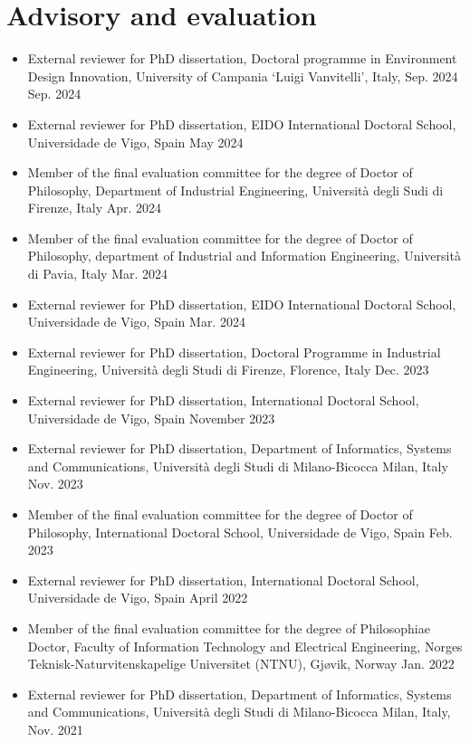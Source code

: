 \documentclass[11pt]{article}
\begin{document}
\section*{Advisory and evaluation}

\begin{itemize}
		\item External reviewer for PhD dissertation, Doctoral programme in Environment Design Innovation, University of Campania `Luigi Vanvitelli', Italy, Sep. 2024 \hfill Sep. 2024
    \item External reviewer for PhD dissertation, EIDO International Doctoral School, Universidade de Vigo, Spain \hfill May 2024
		\item Member of the final evaluation committee for the degree of Doctor of Philosophy, Department of Industrial Engineering, Università degli Sudi di Firenze, Italy \hfill Apr. 2024
    \item Member of the final evaluation committee for the degree of Doctor of Philosophy, department of Industrial and Information Engineering, Università di Pavia, Italy \hfill Mar. 2024
    \item External reviewer for PhD dissertation, EIDO International Doctoral School, Universidade de Vigo, Spain \hfill Mar. 2024
    \item External reviewer for PhD dissertation, Doctoral Programme in Industrial Engineering, Università degli Studi di Firenze, Florence, Italy \hfill Dec. 2023
    \item External reviewer for PhD dissertation, International Doctoral School, Universidade de Vigo, Spain \hfill November 2023
    \item External reviewer for PhD dissertation, Department of Informatics, Systems and Communications, Università degli Studi di Milano-Bicocca Milan, Italy \hfill Nov. 2023
		\item Member of the final evaluation committee for the degree of Doctor of Philosophy, International Doctoral School, Universidade de Vigo, Spain \hfill Feb. 2023
    \item External reviewer for PhD dissertation, International Doctoral School, Universidade de Vigo, Spain \hfill April 2022
    \item Member of the final evaluation committee for the degree of Philosophiae Doctor, Faculty of Information Technology and Electrical Engineering, Norges Teknisk-Naturvitenskapelige Universitet (NTNU), Gjøvik, Norway \hfill Jan. 2022
    \item External reviewer for PhD dissertation, Department of Informatics, Systems and Communications, Università degli Studi di Milano-Bicocca Milan, Italy, \hfill Nov. 2021

\end{itemize}
\end{document}
